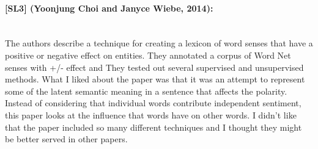 \documentclass[12pt]{article}
\begin{document}
\paragraph{{\bf [SL3] (Yoonjung Choi and Janyce Wiebe, 2014):} } 
\text{} \\
The authors describe a technique for creating a lexicon of word senses that have a positive or negative effect on entities. They annotated a corpus of Word Net senses with +/- effect and They tested out several supervised and unsupervised methods. What I liked about the paper was that it was an attempt to represent some of the latent semantic meaning in a sentence that affects the polarity.  Instead of considering that individual words contribute independent sentiment, this paper looks at the influence that words have on other words.  I didn't like that the paper included so many different techniques and I thought they might be better served in other papers.
\end{document}
